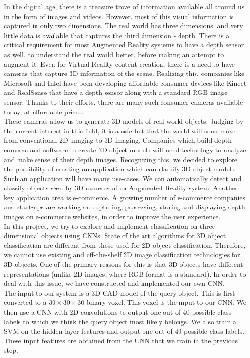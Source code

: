 \documentclass[10pt,twocolumn,letterpaper]{article}
\begin{document}
In the digital age, there is a treasure trove of information available all around us in the form of images and videos. However, most of this visual information is captured in only two dimensions. The real world has three dimensions, and very little data is available that captures the third dimension - depth. There is a critical requirement for most Augmented Reality systems to have a depth sensor as well, to understand the real world better, before making an attempt to augment it. Even for Virtual Reality content creation, there is a need to have cameras that capture 3D information of the scene. Realizing this, companies like Microsoft and Intel have been developing affordable consumer devices like Kinect and RealSense that have a depth sensor along with a standard RGB image sensor. Thanks to their efforts, there are many such consumer cameras available today, at affordable prices.
\\
These cameras allow us to generate 3D models of real world objects. Judging by the current interest in this field, it is a safe bet that the world will soon move from conventional 2D imaging to 3D imaging. Companies which build depth cameras and software to create 3D object models will need technology to analyze and make sense of their depth images. Recognizing this, we decided to explore the possibility of creating an application which can classify 3D object models. Such an application will have many use-cases. We can automatically detect and classify objects seen by 3D cameras of an Augmented Reality system. Another key application area is e-commerce. A growing number of e-commerce companies and start-ups are working on capturing, processing, storing and displaying depth images on e-commerce websites, in order to improve the user experience.
\\
In this project, we try to explore and implement classification on three-dimensional objects using CNNs. State of the art algorithms for 3D object classification are different from those used for 2D object classification. Therefore, we cannot use existing and off-the-shelf 2D image classification technologies for 3D objects. One of the primary reasons for this is that 3D objects have different representations (unlike 2D images, where RGB format is a standard). In order to deal with this issue, we have constructed and implemented our own CNN.
\\
The input to our system is a 3D CAD model of the query object. This is first converted to a $30\times30\times30$ binary voxel. This voxel is the input to our CNN. We then use a CNN with 2D convolutions to output one out of 40 possible class labels to which we think the query object most likely belongs. We also train a SVM on the hidden layer features and output one out of 40 possible class labels. These input features are obtained from the CNN that we train in the previous step.
\end{document}
